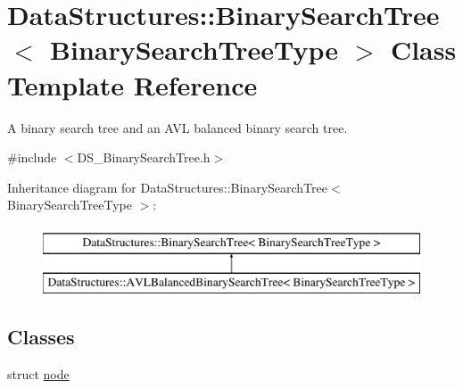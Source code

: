 \hypertarget{class_data_structures_1_1_binary_search_tree}{\section{Data\-Structures\-:\-:Binary\-Search\-Tree$<$ Binary\-Search\-Tree\-Type $>$ Class Template Reference}
\label{class_data_structures_1_1_binary_search_tree}
}


A binary search tree and an A\-V\-L balanced binary search tree.  




{\ttfamily \#include $<$D\-S\-\_\-\-Binary\-Search\-Tree.\-h$>$}

Inheritance diagram for Data\-Structures\-:\-:Binary\-Search\-Tree$<$ Binary\-Search\-Tree\-Type $>$\-:\begin{figure}[H]
\begin{center}
\leavevmode
\includegraphics[height=2.000000cm]{class_data_structures_1_1_binary_search_tree}
\end{center}
\end{figure}
\subsection*{Classes}
\begin{DoxyCompactItemize}
\item 
struct \hyperlink{struct_data_structures_1_1_binary_search_tree_1_1node}{node}
\end{DoxyCompactItemize}
